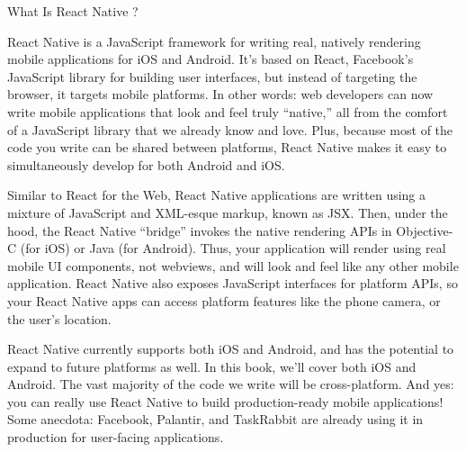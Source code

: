 What Is React Native ?

React Native is a JavaScript framework for writing real, 
natively rendering mobile applications for iOS and Android. 
It’s based on React, Facebook’s JavaScript library for building user 
interfaces, but instead of targeting the browser, it targets mobile platforms. 
In other words: web developers can now write mobile applications that look and 
feel truly “native,” all from the comfort of a JavaScript library that we 
already know and love. Plus, because most of the code you write can be shared 
between platforms, React Native makes it easy to simultaneously develop for 
both Android and iOS.

Similar to React for the Web, React Native applications are written using 
a mixture of JavaScript and XML-esque markup, known as JSX. Then, under the 
hood, the React Native “bridge” invokes the native rendering APIs in 
Objective-C (for iOS) or Java (for Android). Thus, your application will 
render using real mobile UI components, not webviews, and will look and feel 
like any other mobile application. React Native also exposes JavaScript 
interfaces for platform APIs, so your React Native apps can access platform 
features like the phone camera, or the user’s location.

React Native currently supports both iOS and Android, and has the potential 
to expand to future platforms as well. In this book, we’ll cover both iOS and 
Android. The vast majority of the code we write will be cross-platform. 
And yes: you can really use React Native to build production-ready mobile 
applications! Some anecdota: Facebook, Palantir, and TaskRabbit are already 
using it in production for user-facing applications.